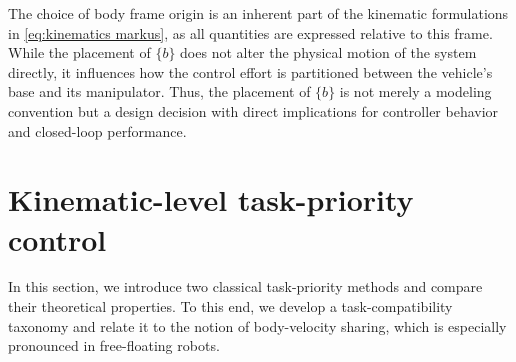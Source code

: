 \documentclass[../main.tex]{subfiles}
\begin{document}
The choice of body frame origin is an inherent part of the kinematic formulations in \eqref{eq:kinematics markus}, as all quantities are expressed relative to this frame. 
While the placement of $\{b\}$ does not alter the physical motion of the system directly, it influences how the control effort is partitioned between the vehicle's base and its manipulator. Thus, the placement of $\{b\}$ is not merely a modeling convention but a design decision with direct implications for controller behavior and closed-loop performance.



\section{Kinematic-level task-priority control}
\label{sec:task_priority}
In this section, we introduce two classical task-priority methods and compare their theoretical properties. To this end, we develop a task-compatibility taxonomy and relate it to the notion of body-velocity sharing, which is especially pronounced in free-floating robots.

\end{document}
